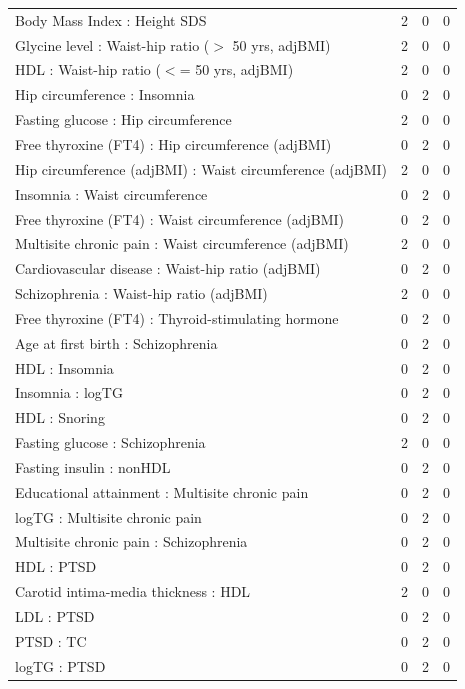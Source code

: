 \begin{table}[ht]
\begin{tabular}{lrrr}
  Body Mass Index  : Height SDS &   2 &   0 &   0 \\ 
  Glycine level  : Waist-hip ratio ($>$ 50 yrs, adjBMI) &   2 &   0 &   0 \\ 
  HDL : Waist-hip ratio ($<$= 50 yrs, adjBMI) &   2 &   0 &   0 \\ 
  Hip circumference  : Insomnia &   0 &   2 &   0 \\ 
  Fasting glucose : Hip circumference  &   2 &   0 &   0 \\ 
  Free thyroxine (FT4) : Hip circumference (adjBMI) &   0 &   2 &   0 \\ 
  Hip circumference (adjBMI) : Waist circumference (adjBMI) &   2 &   0 &   0 \\ 
  Insomnia : Waist circumference  &   0 &   2 &   0 \\ 
  Free thyroxine (FT4) : Waist circumference (adjBMI) &   0 &   2 &   0 \\ 
  Multisite chronic pain : Waist circumference (adjBMI) &   2 &   0 &   0 \\ 
  Cardiovascular disease : Waist-hip ratio (adjBMI) &   0 &   2 &   0 \\ 
  Schizophrenia : Waist-hip ratio (adjBMI) &   2 &   0 &   0 \\ 
  Free thyroxine (FT4) : Thyroid-stimulating hormone  &   0 &   2 &   0 \\ 
  Age at first birth  : Schizophrenia &   0 &   2 &   0 \\ 
  HDL : Insomnia &   0 &   2 &   0 \\ 
  Insomnia : logTG &   0 &   2 &   0 \\ 
  HDL : Snoring &   0 &   2 &   0 \\ 
  Fasting glucose : Schizophrenia &   2 &   0 &   0 \\ 
  Fasting insulin : nonHDL &   0 &   2 &   0 \\ 
  Educational attainment : Multisite chronic pain &   0 &   2 &   0 \\ 
  logTG : Multisite chronic pain &   0 &   2 &   0 \\ 
  Multisite chronic pain : Schizophrenia &   0 &   2 &   0 \\ 
  HDL : PTSD &   0 &   2 &   0 \\ 
  Carotid intima-media thickness : HDL &   2 &   0 &   0 \\ 
  LDL : PTSD &   0 &   2 &   0 \\ 
  PTSD : TC &   0 &   2 &   0 \\ 
  logTG : PTSD &   0 &   2 &   0 \\ 

\end{tabular}
\end{table}
